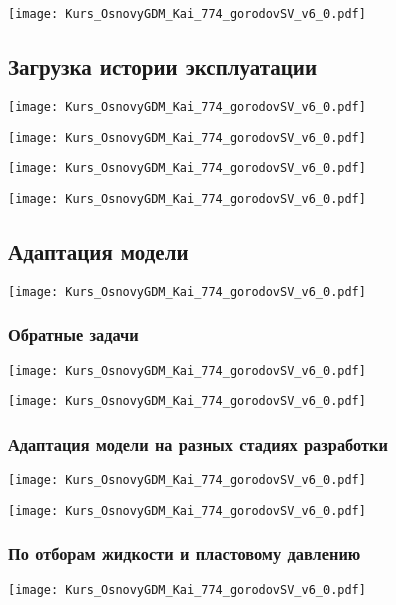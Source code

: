 \documentclass[main.tex]{subfiles}
\begin{document}
\texttt{[image: Kurs\_OsnovyGDM\_Kai\_774\_gorodovSV\_v6\_0.pdf]}

\subsection{Загрузка истории эксплуатации}

\texttt{[image: Kurs\_OsnovyGDM\_Kai\_774\_gorodovSV\_v6\_0.pdf]}

\texttt{[image: Kurs\_OsnovyGDM\_Kai\_774\_gorodovSV\_v6\_0.pdf]}

\texttt{[image: Kurs\_OsnovyGDM\_Kai\_774\_gorodovSV\_v6\_0.pdf]}

\texttt{[image: Kurs\_OsnovyGDM\_Kai\_774\_gorodovSV\_v6\_0.pdf]}

\subsection{Адаптация модели}

\texttt{[image: Kurs\_OsnovyGDM\_Kai\_774\_gorodovSV\_v6\_0.pdf]}

\subsubsection{Обратные задачи}

\texttt{[image: Kurs\_OsnovyGDM\_Kai\_774\_gorodovSV\_v6\_0.pdf]}

\texttt{[image: Kurs\_OsnovyGDM\_Kai\_774\_gorodovSV\_v6\_0.pdf]}

\subsubsection{Адаптация модели на разных стадиях разработки}

\texttt{[image: Kurs\_OsnovyGDM\_Kai\_774\_gorodovSV\_v6\_0.pdf]}

\texttt{[image: Kurs\_OsnovyGDM\_Kai\_774\_gorodovSV\_v6\_0.pdf]}

\subsubsection{По отборам жидкости и пластовому давлению}

\texttt{[image: Kurs\_OsnovyGDM\_Kai\_774\_gorodovSV\_v6\_0.pdf]}
\end{document}

